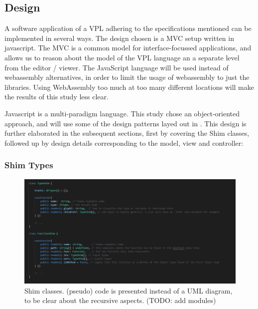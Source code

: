 \subsection{Design}


A software application of a VPL adhering to the specifications mentioned can be implemented in several ways. 
The design chosen is a \ac{MVC} setup written in javascript.  
The \ac{MVC} is a common model for interface-focussed applications, and allows us to reason about the model of the VPL language an a separate level from the editor / viewer.
The JavaScript language will be used instead of webassembly alternatives, in order to limit the usage of webassembly to just the libraries. 
Using WebAssembly too much at too many different locations will make the results of this study less clear.

Javascript is a multi-paradigm language.
This study chose an object-oriented approach, and will use some of the design patterns layed out in \citep{gamma_design_1994}.
This design is further elaborated in the subsequent sections, first by covering the Shim classes, followed up by design details corresponding to the model, view and controller:

\subsubsection*{Shim Types}

\begin{figure}
  \centering
  \graphicspath{ {../../assets/images/implementation/} }
  \includegraphics[width=\linewidth]{shim-uml.png}
  \caption[Shim Classes]{Shim classes. (pseudo) code is presented instead of a UML diagram, to be clear about the recursive aspects. (TODO: add modules) }
  \label{fig:shim-classes}
\end{figure}

